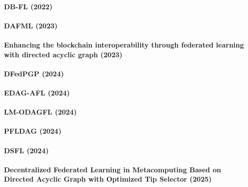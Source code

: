 \newpage
\paragraph{DB-FL (2022)} \cite{xue_energy_2022}

\newpage
\paragraph{DAFML (2023)} \cite{wu_dag_2023}

\newpage
\paragraph{Enhancing the blockchain interoperability through federated learning with directed acyclic graph (2023)} \cite{xia_enhancing_2023}

\newpage
\paragraph{DFedPGP (2024)} \cite{liu_decentralized_2024}

\newpage
\paragraph{EDAG-AFL (2024)} \cite{pvn_edge-enabled_2024}

\newpage
\paragraph{LM-ODAGFL (2024)} \cite{nalinipriya_optimal_2024}

\newpage
\paragraph{PFLDAG (2024)} \cite{huang_personalized_2024}

\newpage
\paragraph{DSFL (2024)} \cite{xiao_adaptive_2024}

\newpage
\paragraph{Decentralized Federated Learning in
Metacomputing Based on Directed Acyclic Graph
with Optimized Tip Selector (2025)} \cite{jiang_decentralized_2025}









